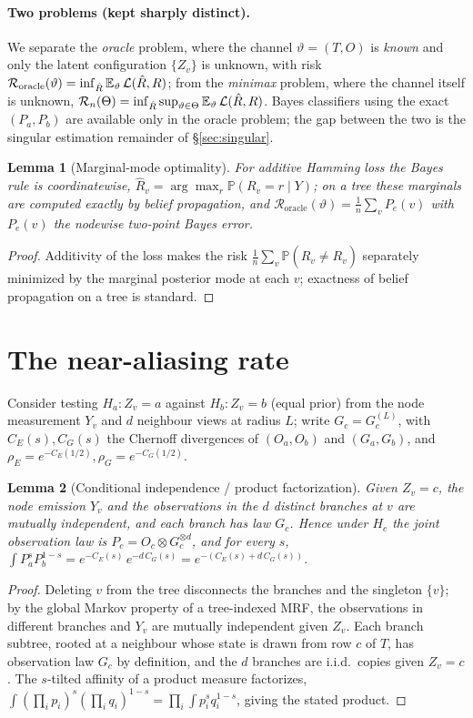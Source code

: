 \documentclass[11pt]{article}
\theoremstyle{plain}
\newtheorem{lemma}{Lemma}
\theoremstyle{definition}\newtheorem{assumption}{Assumption}\newtheorem{remark}{Remark}
\newcommand{\Pf}{\mathbb{P}}\newcommand{\I}{\mathbb{1}}\newcommand{\HH}{\mathbb{H}}\newcommand{\TV}{\mathrm{TV}}
\begin{document}
\paragraph{Two problems (kept sharply distinct).} We separate the \emph{oracle} problem, where the channel
$\vartheta=(T,O)$ is \emph{known} and only the latent configuration $\{Z_v\}$ is unknown, with risk
$\mathcal R_{\mathrm{oracle}}(\vartheta)=\inf_{\hat R}\mathbb{E}_\vartheta\,\mathcal L(\hat R,R)$; from the \emph{minimax}
problem, where the channel itself is unknown, $\mathcal R_n(\Theta)=\inf_{\hat R}\sup_{\vartheta\in\Theta}
\mathbb{E}_\vartheta\,\mathcal L(\hat R,R)$. Bayes classifiers using the exact $(P_a,P_b)$ are available only in the oracle
problem; the gap between the two is the singular estimation remainder of \S\ref{sec:singular}.
\begin{lemma}[Marginal-mode optimality]\label{thm:oracle-risk}
For additive Hamming loss the Bayes rule is coordinatewise, $\hat R_v=\arg\max_r\Pf(R_v{=}r\mid Y)$; on a tree
these marginals are computed exactly by belief propagation, and $\mathcal R_{\mathrm{oracle}}(\vartheta)=\frac1n
\sum_v P_e(v)$ with $P_e(v)$ the nodewise two-point Bayes error.
\end{lemma}
\begin{proof}
Additivity of the loss makes the risk $\frac1n\sum_v\Pf(\hat R_v\neq R_v)$ separately minimized by the marginal
posterior mode at each $v$; exactness of belief propagation on a tree is standard.
\end{proof}

\section{The near-aliasing rate}\label{sec:rate}
Consider testing $H_a:Z_v{=}a$ against $H_b:Z_v{=}b$ (equal prior) from the node measurement $Y_v$ and $d$
neighbour views at radius $L$; write $G_c=G_c^{(L)}$, with $C_E(s),C_G(s)$ the Chernoff divergences of
$(O_a,O_b)$ and $(G_a,G_b)$, and $\rho_E=e^{-C_E(1/2)},\rho_G=e^{-C_G(1/2)}$.

\begin{lemma}[Conditional independence / product factorization]\label{lem:prod}
Given $Z_v=c$, the node emission $Y_v$ and the observations in the $d$ distinct branches at $v$ are mutually
independent, and each branch has law $G_c$. Hence under $H_c$ the joint observation law is
$P_c=O_c\otimes G_c^{\otimes d}$, and for every $s$,
$\int P_a^s P_b^{1-s}=e^{-C_E(s)}\,e^{-d\,C_G(s)}=e^{-(C_E(s)+d\,C_G(s))}$.
\end{lemma}
\begin{proof}
Deleting $v$ from the tree disconnects the branches and the singleton $\{v\}$; by the global Markov property of a
tree-indexed MRF, the observations in different branches and $Y_v$ are mutually independent given $Z_v$. Each
branch subtree, rooted at a neighbour whose state is drawn from row $c$ of $T$, has observation law $G_c$ by
definition, and the $d$ branches are i.i.d.\ copies given $Z_v=c$. The $s$-tilted affinity of a product measure
factorizes, $\int(\prod_i p_i)^s(\prod_i q_i)^{1-s}=\prod_i\int p_i^s q_i^{1-s}$, giving the stated product.
\end{proof}
\end{document}
